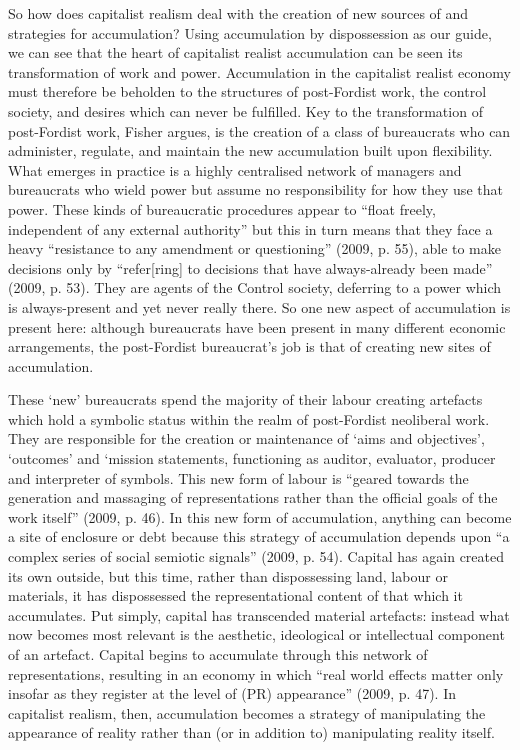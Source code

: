 So how does capitalist realism deal with the creation of new sources of
and strategies for accumulation? Using accumulation by dispossession as
our guide, we can see that the heart of capitalist realist accumulation
can be seen its transformation of work and power. Accumulation in the
capitalist realist economy must therefore be beholden to the structures
of post-Fordist work, the control society, and desires which can never
be fulfilled. Key to the transformation of post-Fordist work, Fisher
argues, is the creation of a class of bureaucrats who can administer,
regulate, and maintain the new accumulation built upon flexibility. What
emerges in practice is a highly centralised network of managers and
bureaucrats who wield power but assume no responsibility for how they
use that power. These kinds of bureaucratic procedures appear to ``float
freely, independent of any external authority'' but this in turn means
that they face a heavy ``resistance to any amendment or questioning''
(2009, p. 55), able to make decisions only by ``refer{[}ring{]} to
decisions that have always-already been made'' (2009, p. 53). They are
agents of the Control society, deferring to a power which is
always-present and yet never really there. So one new aspect of
accumulation is present here: although bureaucrats have been present in
many different economic arrangements, the post-Fordist bureaucrat's job
is that of creating new sites of accumulation.

These `new' bureaucrats spend the majority of their labour creating
artefacts which hold a symbolic status within the realm of post-Fordist
neoliberal work. They are responsible for the creation or maintenance of
`aims and objectives', `outcomes' and `mission statements, functioning
as auditor, evaluator, producer and interpreter of symbols. This new
form of labour is ``geared towards the generation and massaging of
representations rather than the official goals of the work itself''
(2009, p. 46). In this new form of accumulation, anything can become a
site of enclosure or debt because this strategy of accumulation depends
upon ``a complex series of social semiotic signals'' (2009, p. 54).
Capital has again created its own outside, but this time, rather than
dispossessing land, labour or materials, it has dispossessed the
representational content of that which it accumulates. Put simply,
capital has transcended material artefacts: instead what now becomes
most relevant is the aesthetic, ideological or intellectual component of
an artefact. Capital begins to accumulate through this network of
representations, resulting in an economy in which ``real world effects
matter only insofar as they register at the level of (PR) appearance''
(2009, p. 47). In capitalist realism, then, accumulation becomes a
strategy of manipulating the appearance of reality rather than (or in
addition to) manipulating reality itself.

